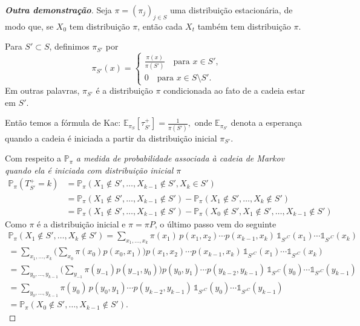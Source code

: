 \documentclass[12pt,letterpaper]{article}
\def\mathbbm#1{\mathds{#1}}
\begin{document}
\begin{proof}[\textbf{Outra demonstração}]

  Seja \( \pi = (\pi_j)_{j \in S} \) uma distribuição estacionária, de
  modo que, se \( X_0 \) tem distribuição \( \pi \), então cada
  \( X_t \) também tem distribuição \( \pi \).

  Para \( S' \subset S \), definimos \( \pi_{S'} \) por
  \[
    \pi_{S'}(x) =
    \begin{cases}
      \frac{\pi(x)}{\pi(S')} \quad \text{para } x \in S',\\
      0  \quad \text{para } x \in S \setminus S'.
    \end{cases}
  \]
  Em outras palavras, \( \pi_{S'} \) é a distribuição \( \pi \)
  condicionada ao fato de a cadeia estar em \( S' \).

  Então temos a fórmula de Kac:
  \( \mathbb{E}_{\pi_S}[\tau_{S'}^+] = \frac{1}{\pi({S'})}, \) onde
  \( \mathbb{E}_{\pi_{S'}} \) denota a esperança quando a cadeia é
  iniciada a partir da distribuição inicial \( \pi_{S'} \).

  Com respeito a $\mathbb{P}_\pi$ \textit{a medida de probabilidade
    associada à cadeia de Markov quando ela é iniciada com distribuição
    inicial $\pi$}
  \[
    \begin{aligned}
      \mathbb{P}_\pi(T_{S'}^+ = k)
      &= \mathbb{P}_\pi(X_1 \notin {S'}, \ldots, X_{k-1} \notin {S'}, X_k \in {S'}) \\
      &= \mathbb{P}_\pi(X_1 \notin {S'}, \ldots, X_{k-1} \notin {S'}) 
      - \mathbb{P}_\pi(X_1 \notin {S'}, \ldots, X_k \notin {S'})\\
      &= \mathbb{P}_\pi(X_1 \notin {S'}, \ldots, X_{k-1} \notin {S'})
      - \mathbb{P}_\pi(X_0 \notin {S'}, X_1 \notin {S'}, \ldots, X_{k-1} \notin {S'})
    \end{aligned}
  \]
  Como $\pi$ é a distribuição inicial e $\pi=\pi P$, o último passo vem
  do seguinte
  \[
    \begin{aligned}
      \mathbb{P}_\pi(X_1 \notin {S'}, \ldots, X_{k} \notin {S'})
      = \sum_{x_1, \ldots, x_{k}}
      \pi(x_1)\, p(x_1, x_2) \cdots p(x_{k-1}, x_{k})
      \,\mathbbm{1}_{{S'}^C}(x_1) \cdots \mathbbm{1}_{{S'}^C}(x_{k}) \\[6pt]
      = \sum_{x_1, \ldots, x_{k}}
      \Biggl(\sum_{x_0} \pi(x_0) p(x_0, x_1)\Biggr)
      p(x_1, x_2) \cdots p(x_{k-1}, x_k)
      \,\mathbbm{1}_{{S'}^C}(x_1) \cdots \mathbbm{1}_{{S'}^C}(x_k) \\[6pt]
      = \sum_{y_{0}, \ldots, y_{k-1}}
      \Biggl(\sum_{y_{-1}} \pi(y_{-1}) p(y_{-1}, y_0)\Biggr)
      p(y_{0}, y_{1}) \cdots p(y_{k-2}, y_{k-1})
      \,\mathbbm{1}_{{S'}^C}(y_0) \cdots \mathbbm{1}_{{S'}^C}(y_{k-1}) \\[6pt]
      = \sum_{y_{0}, \ldots, y_{k-1}}
      \pi(y_0)\, p(y_{0}, y_{1}) \cdots p(y_{k-2}, y_{k-1})
      \,\mathbbm{1}_{{S'}^C}(y_0) \cdots \mathbbm{1}_{{S'}^C}(y_{k-1}) \\[6pt]
      = \mathbb{P}_\pi(X_0 \notin {S'}, \ldots, X_{k-1} \notin {S'}).
    \end{aligned}
  \]


\end{proof}
\end{document}
